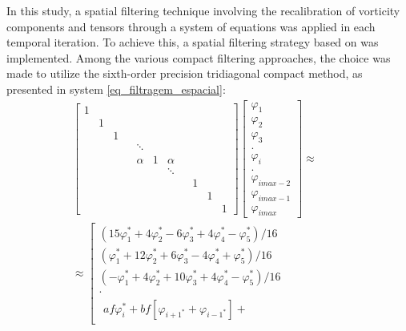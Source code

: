 \documentclass[preprint, 12pt]{elsarticle}
\begin{document}
In this study, a spatial filtering technique involving the recalibration of vorticity components and tensors through a system of equations was applied in each temporal iteration. To achieve this, a spatial filtering strategy based on \citet{lele1992compact} was implemented. Among the various compact filtering approaches, the choice was made to utilize the sixth-order precision tridiagonal compact method, as presented in system \eqref{eq_filtragem_espacial}:
\begin{align}
\left[\begin{array}{ccccccccccc}
    1 &  & & & & & & & & &\\
     & 1 &  & & & & & & & & \\
    & & 1 & & & & & & & &\\
    & &  &  & \ddots & &  &  & & & \\
    & & &  & \alpha & 1 & \alpha &  & & &  \\
    & & & &  &  & \ddots &  &  & & \\
    & & & & &  &  & & 1 & & \\
    & & & & &  &  & & & 1 & \\
    & & & & &  &  & & &  & 1
\end{array}\right] \left[\begin{array}{c}
    \varphi_{1} \\
    \varphi_{2}  \\
    \varphi_{3}  \\
     . \\
    \varphi_{i}  \\
     . \\
    \varphi_{imax-2} \\
    \varphi_{imax-1} \\
    \varphi_{imax} 
\end{array}\right] \approx \hspace{1cm} \nonumber\\ 
\approx \left[\begin{array}{c}
(15\varphi_{1}^* +  4 \varphi_{2}^* -  6 \varphi_{3}^* +  4  \varphi_{4}^*
 -         \varphi_{5}^* ) / 16 \\
( \varphi_{1}^* + 12\varphi_{2}^*+  6\varphi_{3}^* -  4 \varphi_{4}^*
+         \varphi_{5}^*) / 16\\
 (   - \varphi_{1}^* +  4\varphi_{2}^*
+ 10\varphi_{3}^* +  4\varphi_{4}^* - \varphi_{5}^* ) / 16\\
. \\
\begin{gathered}
    af \varphi_{i}^*+bf\left[\varphi_{{i+1}^*}+\varphi_{{i-1}^*}\right]+ 

\end{gathered}
\end{array}
\end{align}
\end{document}
